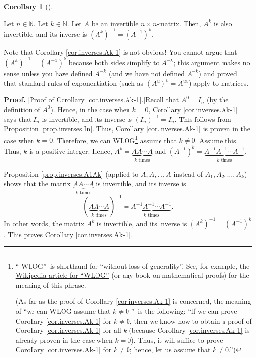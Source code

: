 \documentclass[numbers=enddot,12pt,final,onecolumn,notitlepage]{scrartcl}%
\theoremstyle{definition}
\newtheorem{coro}[theo]{Corollary}
\newenvironment{corollary}[1][]
{\begin{coro}[#1]\begin{leftbar}}
{\end{leftbar}\end{coro}}
\newenvironment{proof}[1][Proof]{\noindent\textbf{#1.} }{\ \rule{0.5em}{0.5em}}
\begin{document}
\begin{corollary}
\label{cor.inverses.Ak-1}Let $n\in\mathbb{N}$. Let $k\in\mathbb{N}$. Let $A$
be an invertible $n\times n$-matrix. Then, $A^{k}$ is also invertible, and its
inverse is $\left(  A^{k}\right)  ^{-1}=\left(  A^{-1}\right)  ^{k}$.
\end{corollary}

Note that Corollary \ref{cor.inverses.Ak-1} is not obvious! You cannot argue
that $\left(  A^{k}\right)  ^{-1}=\left(  A^{-1}\right)  ^{k}$ because both
sides simplify to $A^{-k}$; this argument makes no sense unless you have
defined $A^{-k}$ (and we have not defined $A^{-k}$) and proved that standard
rules of exponentiation (such as $\left(  A^{u}\right)  ^{v}=A^{uv}$) apply to matrices.

\begin{proof}
[Proof of Corollary \ref{cor.inverses.Ak-1}.]Recall that $A^{0}=I_{n}$ (by the
definition of $A^{0}$). Hence, in the case when $k=0$, Corollary
\ref{cor.inverses.Ak-1} says that $I_{n}$ is invertible, and its inverse is
$\left(  I_{n}\right)  ^{-1}=I_{n}$. This follows from Proposition
\ref{prop.inverses.In}. Thus, Corollary \ref{cor.inverses.Ak-1} is proven in
the case when $k=0$. Therefore, we can WLOG\footnote{\textquotedblleft
WLOG\textquotedblright\ is shorthand for \textquotedblleft without loss of
generality\textquotedblright. See, for example,
\href{https://en.wikipedia.org/wiki/Without_loss_of_generality}{the Wikipedia
article for \textquotedblleft WLOG\textquotedblright} (or any book on
mathematical proofs) for the meaning of this phrase.
\par
(As far as the proof of Corollary \ref{cor.inverses.Ak-1} is concerned, the
meaning of \textquotedblleft we can WLOG assume that $k\neq0$%
\textquotedblright\ is the following: \textquotedblleft If we can prove
Corollary \ref{cor.inverses.Ak-1} for $k\neq0$, then we know how to obtain a
proof of Corollary \ref{cor.inverses.Ak-1} for all $k$ (because Corollary
\ref{cor.inverses.Ak-1} is already proven in the case when $k=0$). Thus, it
will suffice to prove Corollary \ref{cor.inverses.Ak-1} for $k\neq0$; hence,
let us assume that $k\neq0$.\textquotedblright)} assume that $k\neq0$. Assume
this. Thus, $k$ is a positive integer. Hence, $A^{k}=\underbrace{AA\cdots
A}_{k\text{ times}}$ and $\left(  A^{-1}\right)  ^{k}=\underbrace{A^{-1}%
A^{-1}\cdots A^{-1}}_{k\text{ times}}$.

Proposition \ref{prop.inverses.A1Ak} (applied to $A,A,\ldots,A$ instead of
$A_{1},A_{2},\ldots,A_{k}$) shows that the matrix $\underbrace{AA\cdots
A}_{k\text{ times}}$ is invertible, and its inverse is%
\[
\left(  \underbrace{AA\cdots A}_{k\text{ times}}\right)  ^{-1}%
=\underbrace{A^{-1}A^{-1}\cdots A^{-1}}_{k\text{ times}}.
\]
In other words, the matrix $A^{k}$ is invertible, and its inverse is $\left(
A^{k}\right)  ^{-1}=\left(  A^{-1}\right)  ^{k}$. This proves Corollary
\ref{cor.inverses.Ak-1}.
\end{proof}
\end{document}
